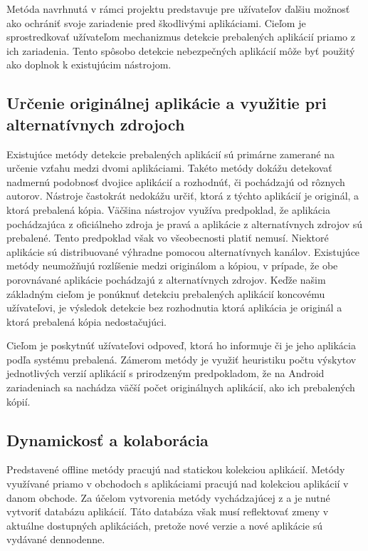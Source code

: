 Metóda navrhnutá v rámci projektu  predstavuje pre užívateľov ďalšiu možnosť ako ochrániť svoje zariadenie pred škodlivými aplikáciami. Cieľom je sprostredkovať užívateľom mechanizmus detekcie prebalených aplikácií priamo z ich zariadenia. Tento spôsobo detekcie nebezpečných aplikácií môže byť použitý ako doplnok k existujúcim nástrojom.


\subsection*{Určenie originálnej aplikácie a využitie pri alternatívnych zdrojoch}

Existujúce metódy detekcie prebalených aplikácií sú primárne zamerané na určenie vzťahu medzi dvomi aplikáciami. Takéto metódy dokážu detekovať nadmernú podobnosť dvojice aplikácií a rozhodnúť, či pochádzajú od rôznych autorov. Nástroje častokrát nedokážu určiť, ktorá z týchto aplikácií je originál, a ktorá prebalená kópia. Väčšina nástrojov využíva predpoklad, že aplikácia pochádzajúca z oficiálneho zdroja  je pravá a aplikácie z alternatívnych zdrojov sú prebalené. Tento predpoklad však vo všeobecnosti platiť nemusí. Niektoré aplikácie sú distribuované výhradne pomocou alternatívnych kanálov. Existujúce metódy neumožňujú rozlíšenie medzi originálom a kópiou, v prípade, že obe porovnávané aplikácie pochádzajú z alternatívnych zdrojov. Keďže našim základným cieľom je ponúknuť detekciu prebalených aplikácií koncovému užívateľovi, je výsledok detekcie bez rozhodnutia ktorá aplikácia je originál a ktorá prebalená kópia nedostačujúci. 


Cieľom je poskytnúť užívateľovi odpoveď, ktorá ho informuje či je jeho aplikácia podľa systému  prebalená. 
Zámerom metódy  je využiť heuristiku počtu výskytov jednotlivých verzií aplikácií s prirodzeným predpokladom, že na Android zariadeniach sa nachádza väčší počet originálnych aplikácií, ako ich prebalených kópií. 

\subsection*{Dynamickosť a kolaborácia}
Predstavené offline metódy pracujú nad statickou kolekciou aplikácií. Metódy využívané priamo v obchodoch s aplikáciami pracujú nad kolekciou aplikácií v danom obchode. Za účelom vytvorenia metódy vychádzajúcej z  a  je nutné vytvoriť databázu aplikácií. Táto databáza však musí reflektovať zmeny v aktuálne dostupných aplikáciách, pretože nové verzie a nové aplikácie sú vydávané dennodenne. 


